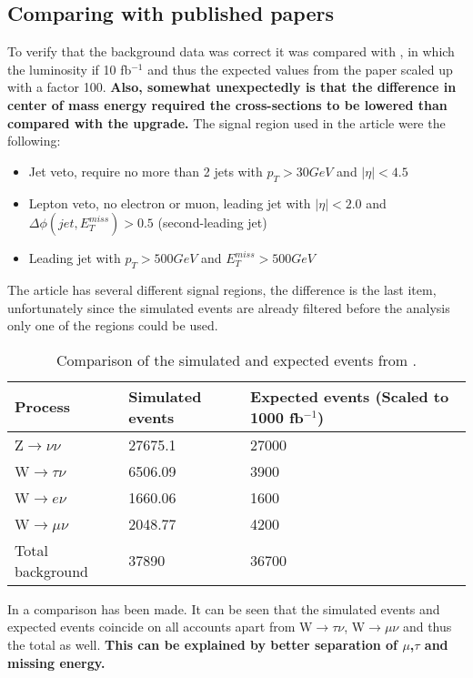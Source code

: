 \subsection{Comparing with published papers} 	
To verify that the background data was correct it was compared with \citep{ATLAS-CONF-2012-147}, in which the luminosity if 10 fb$^{-1}$ and thus the expected values from the paper scaled up with a factor 100. \textbf{Also, somewhat unexpectedly is that the difference in center of mass energy required the cross-sections to be lowered than compared with the upgrade.} The signal region used in the article were the following:
\begin{itemize}
\item Jet veto, require no more than 2 jets with $p_T > 30 GeV$ and $|\eta| < 4.5$
\item Lepton veto, no electron or muon, leading jet with $|\eta| < 2.0$ and $\Delta \phi (jet, E_T^{miss})>0.5$ (second-leading jet)
\item Leading jet with $p_T > 500 GeV$ and $E_T^{miss}>500 GeV$
\end{itemize}
The article has several different signal regions, the difference is the last item, unfortunately since the simulated events are already filtered before the analysis only one of the regions could be used.
\begin{table}[ht]
\begin{center}
\begin{tabular}{|l|l|l|}
\hline
Process & Simulated events & Expected events (Scaled to 1000 fb$^{-1}$) \\ \hline
Z$\rightarrow\nu\nu$&27675.1&27000 \\
W$\rightarrow\tau\nu$&6506.09&3900 \\
W$\rightarrow e\nu$&1660.06&1600 \\
W$\rightarrow\mu\nu$&2048.77&4200 \\ \hline
Total background&37890&36700 \\ \hline
\end{tabular}
\caption{Comparison of the simulated and expected events from \citep{ATLAS-CONF-2012-147}.}
\label{tab:Compare1}
\end{center}
\end{table}

In  a comparison has been made. It can be seen that the simulated events and expected events coincide on all accounts apart from W$\rightarrow\tau\nu$, W$\rightarrow\mu\nu$ and thus the total as well. \textbf{This can be explained by better separation of $\mu$,$\tau$ and missing energy.} 


